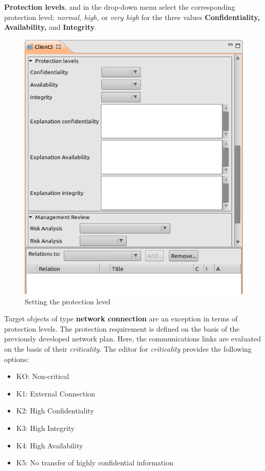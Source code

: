 \documentclass[a4paper,10pt]{book}
\begin{document}
\textbf{Protection levels}, and in the drop-down menu select the corresponding protection level:
{\em normal, high,} or {\em very high} for the three values \textbf{Confidentiality, Availability,} and
\textbf{Integrity}.
\newline
\begin{figure}[htb!]
  \centering
  \includegraphics[scale=.57]{Screenshot/Schutzbedarf-en.png}
  \caption{\label{Setting the protection level} Setting the protection level}
\end{figure}
\newline
Target objects of type \textbf{network connection} are an exception in terms of protection levels.
The protection requirement is defined on the basis of the previously developed network plan.
Here, the communications links are evaluated on the basis of their {\em criticality}. The editor for
{\em criticality} provides the following options:
\begin{itemize}
 \item KO: Non-critical
 \item K1: External Connection
 \item K2: High Confidentiality
 \item K3: High Integrity
 \item K4: High Availability
 \item K5: No transfer of highly confidential information
\end{itemize}
\end{document}
